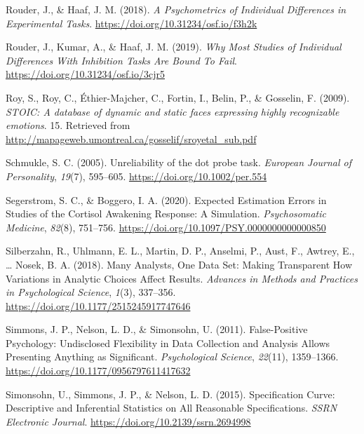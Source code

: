 \documentclass[
  man,floatsintext]{apa6}
\newlength{\cslhangindent}
\newlength{\cslentryspacingunit} %
\newenvironment{CSLReferences}[2] %
 {%
  \setlength{\parindent}{0pt}
  \ifodd #1
  \let\oldpar\par
  \def\par{\hangindent=\cslhangindent\oldpar}
  \fi
  \setlength{\parskip}{#2\cslentryspacingunit}
 }%
 {}
\begin{document}
\begin{CSLReferences}{1}{0}
\leavevmode{}%
Rouder, J., \& Haaf, J. M. (2018). \emph{A {Psychometrics} of {Individual} {Differences} in {Experimental} {Tasks}}. \url{https://doi.org/10.31234/osf.io/f3h2k}

\leavevmode{}%
Rouder, J., Kumar, A., \& Haaf, J. M. (2019). \emph{Why {Most} {Studies} of {Individual} {Differences} {With} {Inhibition} {Tasks} {Are} {Bound} {To} {Fail}}. \url{https://doi.org/10.31234/osf.io/3cjr5}

\leavevmode{}%
Roy, S., Roy, C., Éthier-Majcher, C., Fortin, I., Belin, P., \& Gosselin, F. (2009). \emph{{STOIC}: {A} database of dynamic and static faces expressing highly recognizable emotions}. 15. Retrieved from \url{http://mapageweb.umontreal.ca/gosselif/sroyetal_sub.pdf}

\leavevmode{}%
Schmukle, S. C. (2005). Unreliability of the dot probe task. \emph{European Journal of Personality}, \emph{19}(7), 595--605. \url{https://doi.org/10.1002/per.554}

\leavevmode{}%
Segerstrom, S. C., \& Boggero, I. A. (2020). Expected {Estimation} {Errors} in {Studies} of the {Cortisol} {Awakening} {Response}: {A} {Simulation}. \emph{Psychosomatic Medicine}, \emph{82}(8), 751--756. \url{https://doi.org/10.1097/PSY.0000000000000850}

\leavevmode{}%
Silberzahn, R., Uhlmann, E. L., Martin, D. P., Anselmi, P., Aust, F., Awtrey, E., \ldots{} Nosek, B. A. (2018). Many {Analysts}, {One} {Data} {Set}: {Making} {Transparent} {How} {Variations} in {Analytic} {Choices} {Affect} {Results}. \emph{Advances in Methods and Practices in Psychological Science}, \emph{1}(3), 337--356. \url{https://doi.org/10.1177/2515245917747646}

\leavevmode{}%
Simmons, J. P., Nelson, L. D., \& Simonsohn, U. (2011). False-{Positive} {Psychology}: {Undisclosed} {Flexibility} in {Data} {Collection} and {Analysis} {Allows} {Presenting} {Anything} as {Significant}. \emph{Psychological Science}, \emph{22}(11), 1359--1366. \url{https://doi.org/10.1177/0956797611417632}

\leavevmode{}%
Simonsohn, U., Simmons, J. P., \& Nelson, L. D. (2015). Specification {Curve}: {Descriptive} and {Inferential} {Statistics} on {All} {Reasonable} {Specifications}. \emph{SSRN Electronic Journal}. \url{https://doi.org/10.2139/ssrn.2694998}


\end{CSLReferences}
\end{document}
